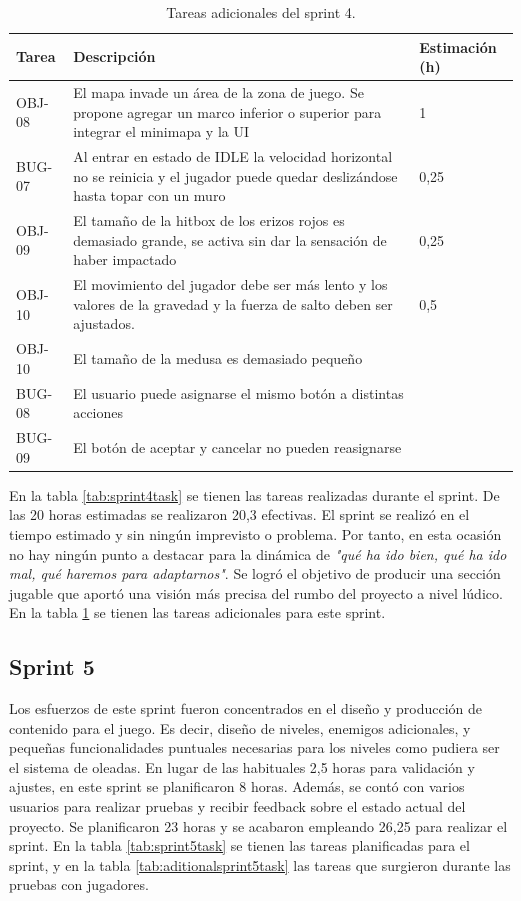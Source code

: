 \begin{table}[!ht]
    \centering
    \begin{tabular}{|l|p{8cm}|l|}
    \hline
        Tarea & Descripción & Estimación (h) \\ \hline
        OBJ-08 & El mapa invade un área de la zona de juego. Se propone agregar un marco inferior o superior para integrar el minimapa y la UI & 1 \\ \hline
        BUG-07 & Al entrar en estado de IDLE la velocidad horizontal no se reinicia y el jugador puede quedar deslizándose hasta topar con un muro & 0,25 \\ \hline
        OBJ-09 & El tamaño de la hitbox de los erizos rojos es demasiado grande, se activa sin dar la sensación de haber impactado & 0,25 \\ \hline
        OBJ-10 & El movimiento del jugador debe ser más lento y los valores de la gravedad y la fuerza de salto deben ser ajustados. & 0,5 \\ \hline
        OBJ-10 & El tamaño de la medusa es demasiado pequeño & ~ \\ \hline
        BUG-08 & El usuario puede asignarse el mismo botón a distintas acciones & ~ \\ \hline
        BUG-09 & El botón de aceptar y cancelar no pueden reasignarse & ~ \\ \hline
    \end{tabular}
    \caption{Tareas adicionales del sprint 4.}
    \label{tab:aditionalsprint4task}
\end{table}

En la tabla \ref{tab:sprint4task} se tienen las tareas realizadas durante el sprint. De las 20 horas estimadas se realizaron 20,3 efectivas. El sprint se realizó en el tiempo estimado y sin ningún imprevisto o problema. Por tanto, en esta ocasión no hay ningún punto a destacar para la dinámica de \textit{"qué ha ido bien, qué ha ido mal, qué haremos para adaptarnos"}. Se logró el objetivo de producir una sección jugable que aportó una visión más precisa del rumbo del proyecto a nivel lúdico. En la tabla \ref{tab:aditionalsprint4task} se tienen las tareas adicionales para este sprint.

\subsection{Sprint 5}

Los esfuerzos de este sprint fueron concentrados en el diseño y producción de contenido para el juego. Es decir, diseño de niveles, enemigos adicionales, y pequeñas funcionalidades puntuales necesarias para los niveles como pudiera ser el sistema de oleadas. En lugar de las habituales 2,5 horas para validación y ajustes, en este sprint se planificaron 8 horas. Además, se contó con varios usuarios para realizar pruebas y recibir feedback sobre el estado actual del proyecto. Se planificaron 23 horas y se acabaron empleando 26,25 para realizar el sprint. En la tabla \ref{tab:sprint5task} se tienen las tareas planificadas para el sprint, y en la tabla \ref{tab:aditionalsprint5task} las tareas que surgieron durante las pruebas con jugadores.

